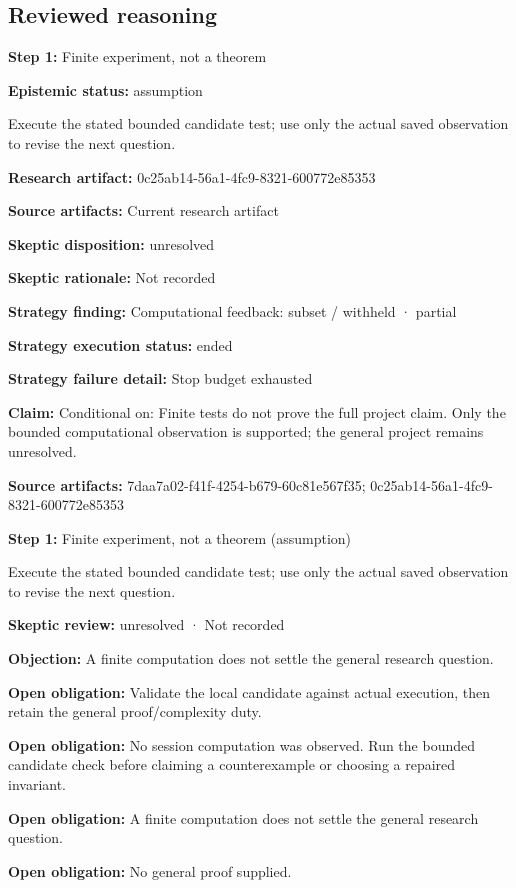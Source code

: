 \documentclass[11pt]{article}
\begin{document}
\subsection{Reviewed reasoning}
\textbf{Step 1:} Finite experiment, not a theorem\par
\textbf{Epistemic status:} assumption\par
Execute the stated bounded candidate test; use only the actual saved observation to revise the next question.\par
\textbf{Research artifact:} 0c25ab14-56a1-4fc9-8321-600772e85353\par
\textbf{Source artifacts:} Current research artifact\par
\textbf{Skeptic disposition:} unresolved\par
\textbf{Skeptic rationale:} Not recorded\par
\textbf{Strategy finding:} Computational feedback: subset / withheld · partial\par
\textbf{Strategy execution status:} ended\par
\textbf{Strategy failure detail:} Stop budget exhausted\par
\textbf{Claim:} Conditional on: Finite tests do not prove the full project claim. Only the bounded computational observation is supported; the general project remains unresolved.\par
\textbf{Source artifacts:} 7daa7a02-f41f-4254-b679-60c81e567f35; 0c25ab14-56a1-4fc9-8321-600772e85353\par
\textbf{Step 1:} Finite experiment, not a theorem (assumption)\par
Execute the stated bounded candidate test; use only the actual saved observation to revise the next question.\par
\textbf{Skeptic review:} unresolved · Not recorded\par
\textbf{Objection:} A finite computation does not settle the general research question.\par
\textbf{Open obligation:} Validate the local candidate against actual execution, then retain the general proof/complexity duty.\par
\textbf{Open obligation:} No session computation was observed. Run the bounded candidate check before claiming a counterexample or choosing a repaired invariant.\par
\textbf{Open obligation:} A finite computation does not settle the general research question.\par
\textbf{Open obligation:} No general proof supplied.\par
\end{document}
